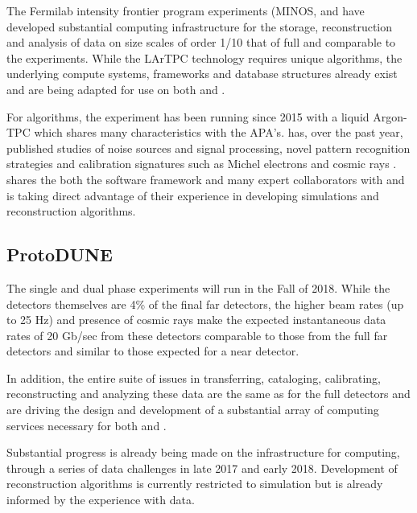 \begin{enumerate}
The Fermilab intensity frontier program experiments (MINOS\cite{minos},  \cite{minerva} and  \cite{nova} have developed substantial computing infrastructure for the storage, reconstruction and analysis of data on size scales of order 1/10 that of full   and comparable to the  experiments. While the LArTPC technology requires unique algorithms, the underlying compute systems, frameworks and database structures already exist and are being adapted for use on both  and  .

For algorithms, the  \cite{Acciarri:2016smi} experiment has been running since 2015 with a liquid Argon-TPC which shares many characteristics with the   APA's.     has, over the past year, published studies of noise sources and signal processing\cite{Acciarri:2017sde,Adams:2018dra}, novel pattern recognition strategies \cite{Acciarri:2016ryt,Acciarri:2017hat} and calibration signatures such as Michel electrons and cosmic rays \cite{Acciarri:2017sjy,Acciarri:2017sde}.    shares the both the \larsoft software framework and many expert collaborators with   and is taking direct advantage of their experience in developing simulations and reconstruction algorithms.


\subsection{ProtoDUNE}\label{sw:PD-planning}

The  single and dual phase experiments will run in the Fall of 2018.  While the detectors themselves are 4\% of the final far detectors, the higher beam rates (up to 25 Hz) and presence of cosmic rays make the expected instantaneous data rates of 20 Gb/sec from these detectors comparable to those from the full far detectors and similar to those expected for a near detector. 

In addition, the entire suite of issues in transferring, cataloging, calibrating, reconstructing and analyzing these data are the same as for the full detectors and are driving the design and development of a substantial array of computing services necessary for both  and  .

Substantial progress is already being made on the infrastructure for computing, through a series of data challenges in late 2017 and early 2018. Development of reconstruction algorithms is currently restricted to simulation but is already informed by the experience with   data.


\end{enumerate}

